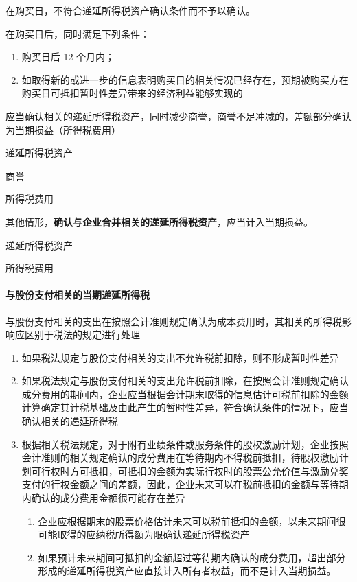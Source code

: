 \documentclass[UTF8,12pt]{ctexart}
\newenvironment{Dr}{%
	\begin{list}{}%
		{
			\setlength{\leftmargin}{2em}
			\setlength{\labelwidth}{2em}
			\setlength{\labelsep}{0pt}
			\setlength{\itemindent}{0pt}
			\setlength{\listparindent}{0pt}
			\setlength{\parsep}{0pt}
			\setlength{\topsep}{0pt}
		}
		\item[\textbf{借：}]
	}{%
	\end{list}
}
\newenvironment{Cr}{%
	\begin{list}{}%
		{
			\setlength{\leftmargin}{3em}
			\setlength{\labelwidth}{2em}
			\setlength{\labelsep}{0pt}
			\setlength{\itemindent}{0pt}
			\setlength{\listparindent}{0pt}
			\setlength{\parsep}{0pt}
			\setlength{\topsep}{0pt}
		}
		\item[\textbf{贷：}]
	}{%
	\end{list}
}
\numberwithin{equation}{section} %
\numberwithin{figure}{section}
\numberwithin{table}{section}
\begin{document}
	在购买日，不符合递延所得税资产确认条件而不予以确认。
	
	在购买日后，同时满足下列条件：
	\begin{enumerate}
		\item 购买日后 12 个月内；
		
		\item 如取得新的或进一步的信息表明购买日的相关情况已经存在，预期被购买方在购买日可抵扣暂时性差异带来的经济利益能够实现的
	\end{enumerate}
	
	应当确认相关的递延所得税资产，同时减少商誉，商誉不足冲减的，差额部分确认为当期损益（所得税费用）
	\begin{Dr}
		递延所得税资产
	\end{Dr}
	\begin{Cr}
		商誉
		
		所得税费用
	\end{Cr}
	
	其他情形，\textbf{确认与企业合并相关的递延所得税资产}，应当计入当期损益。
	\begin{Dr}
		递延所得税资产
	\end{Dr}
	\begin{Cr}
		所得税费用
	\end{Cr}
	
	\paragraph{与股份支付相关的当期递延所得税}
	与股份支付相关的支出在按照会计准则规定确认为成本费用时，其相关的所得税影响应区别于税法的规定进行处理
	\begin{enumerate}
		\item 如果税法规定与股份支付相关的支出不允许税前扣除，则不形成暂时性差异
		
		\item 如果税法规定与股份支付相关的支出允许税前扣除，在按照会计准则规定确认成分费用的期间内，企业应当根据会计期末取得的信息估计可税前扣除的金额计算确定其计税基础及由此产生的暂时性差异，符合确认条件的情况下，应当确认相关的递延所得税
		
		\item 根据相关税法规定，对于附有业绩条件或服务条件的股权激励计划，企业按照会计准则的相关规定确认的成分费用在等待期内不得税前抵扣，待股权激励计划可行权时方可抵扣，可抵扣的金额为实际行权时的股票公允价值与激励兑奖支付的行权金额之间的差额，因此，企业未来可以在税前抵扣的金额与等待期内确认的成分费用金额很可能存在差异
		\begin{enumerate}
			\item 企业应根据期末的股票价格估计未来可以税前抵扣的金额，以未来期间很可能取得的应纳税所得额为限确认递延所得税资产
			
			\item 如果预计未来期间可抵扣的金额超过等待期内确认的成分费用，超出部分形成的递延所得税资产应直接计入所有者权益，而不是计入当期损益。
		\end{enumerate}
	\end{enumerate}
	
\end{document}
